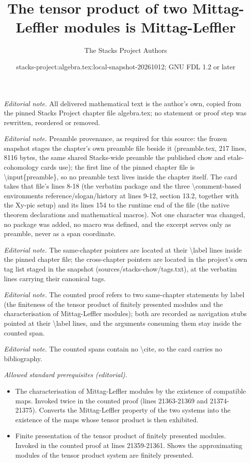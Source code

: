 \documentclass[10pt,a4paper]{amsart}
\title{The tensor product of two Mittag-Leffler modules is Mittag-Leffler}
\author{The Stacks Project Authors}
\date{stacks-project:algebra.tex:local-snapshot-20261012; GNU FDL 1.2 or later}
\theoremstyle{plain}
\theoremstyle{definition}
\theoremstyle{remark}
\numberwithin{equation}{subsection}
\begin{document}
\maketitle
\noindent\textit{Editorial note.} All delivered mathematical text is the author's own, copied from the pinned Stacks Project chapter file algebra.tex; no statement or proof step was rewritten, reordered or removed.\par\medskip
\noindent\textit{Editorial note.} Preamble provenance, as required for this source: the frozen snapshot stages the chapter's own preamble file beside it (preamble.tex, 217 lines, 8116 bytes, the same shared Stacks-wide preamble the published chow and etale-cohomology cards use); the first line of the pinned chapter file is \textbackslash{}input\{preamble\}, so no preamble text lives inside the chapter itself. The card takes that file's lines 8-18 (the verbatim package and the three \textbackslash{}comment-based environments reference/slogan/history at lines 9-12, section 13.2, together with the Xy-pic setup) and its lines 154 to the runtime end of the file (the native theorem declarations and mathematical macros). Not one character was changed, no package was added, no macro was defined, and the excerpt serves only as preamble, never as a span coordinate.\par\medskip
\noindent\textit{Editorial note.} The same-chapter pointers are located at their \textbackslash{}label lines inside the pinned chapter file; the cross-chapter pointers are located in the project's own tag list staged in the snapshot (sources/stacks-chow/tags.txt), at the verbatim lines carrying their canonical tags.\par\medskip
\noindent\textit{Editorial note.} The counted proof refers to two same-chapter statements by label (the finiteness of the tensor product of finitely presented modules and the characterisation of Mittag-Leffler modules); both are recorded as navigation stubs pointed at their \textbackslash{}label lines, and the arguments consuming them stay inside the counted span.\par\medskip
\noindent\textit{Editorial note.} The counted spans contain no \textbackslash{}cite, so the card carries no bibliography.\par\medskip
\noindent\textit{Allowed standard prerequisites (editorial).}\begin{itemize}
\item The characterisation of Mittag-Leffler modules by the existence of compatible maps. Invoked twice in the counted proof (lines 21363-21369 and 21374-21375). Converts the Mittag-Leffler property of the two systems into the existence of the maps whose tensor product is then exhibited.
\item Finite presentation of the tensor product of finitely presented modules. Invoked in the counted proof at lines 21359-21361. Shows the approximating modules of the tensor product system are finitely presented.
\end{itemize}\medskip
\end{document}
